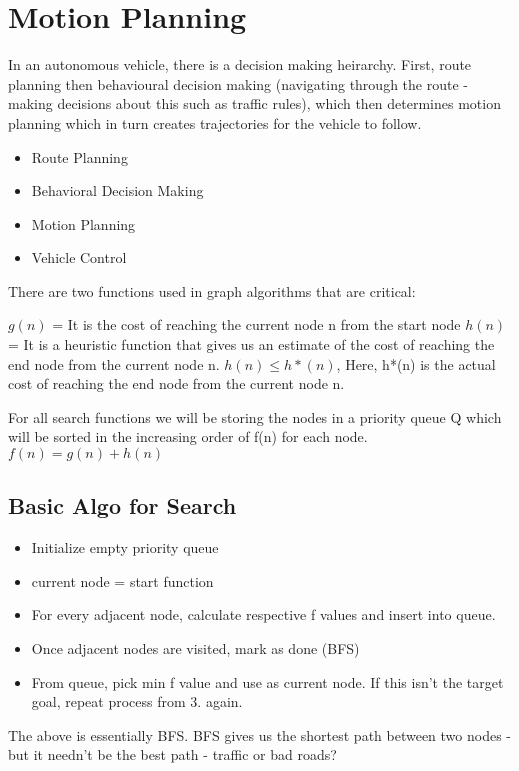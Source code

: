 \chapter{Motion Planning}

In an autonomous vehicle, there is a decision making heirarchy. First, route planning then behavioural decision making (navigating through the route - making decisions about this such as traffic rules), which then determines motion planning which in turn creates trajectories for the vehicle to follow.

\begin{itemize}
    \item Route Planning
    \item Behavioral Decision Making
    \item Motion Planning
    \item Vehicle Control
\end{itemize}

There are two functions used in graph algorithms that are critical:

$g(n)$ = It is the cost of reaching the current node n from the start node
$h(n)$ = It is a heuristic function that gives us an estimate of the cost of reaching the end node from the current node n.
$h(n) \leq h*(n)$, 
Here, h*(n) is the actual cost of reaching the end node from the current node n.

For all search functions we will be storing the nodes in a priority queue Q which will be sorted in the increasing order of f(n) for each node.
$f(n) = g(n) + h(n)$

\section{Basic Algo for Search}

\begin{itemize}
    \item Initialize empty priority queue
    \item current node = start function 
    \item For every adjacent node, calculate respective f values and insert into queue.
    \item Once adjacent nodes are visited, mark as done (BFS)
    \item From queue, pick min f value and use as current node. If this isn't the target goal, repeat process from 3. again.
\end{itemize}

The above is essentially BFS. BFS gives us the shortest path between two nodes - but it needn't be the best path - traffic or bad roads?

